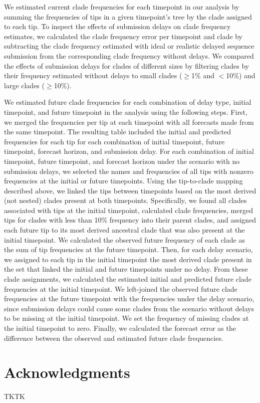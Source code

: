 \documentclass[9pt,lineno]{elife}
\begin{document}
We estimated current clade frequencies for each timepoint in our analysis by summing the frequencies of tips in a given timepoint's tree by the clade assigned to each tip.
To inspect the effects of submission delays on clade frequency estimates, we calculated the clade frequency error per timepoint and clade by subtracting the clade frequency estimated with ideal or realistic delayed sequence submission from the corresponding clade frequency without delays.
We compared the effects of submission delays for clades of different sizes by filtering clades by their frequency estimated without delays to small clades ($\ge$1\% and $<$10\%) and large clades ($\ge$10\%).

We estimated future clade frequencies for each combination of delay type, initial timepoint, and future timepoint in the analysis using the following steps.
First, we merged the frequencies per tip at each timepoint with all forecasts made from the same timepoint.
The resulting table included the initial and predicted frequencies for each tip for each combination of initial timepoint, future timepoint, forecast horizon, and submission delay.
For each combination of initial timepoint, future timepoint, and forecast horizon under the scenario with no submission delays, we selected the names and frequencies of all tips with nonzero frequencies at the initial or future timepoints.
Using the tip-to-clade mapping described above, we linked the tips between timepoints based on the most derived (not nested) clades present at both timepoints.
Specifically, we found all clades associated with tips at the initial timepoint, calculated clade frequencies, merged tips for clades with less than 10\% frequency into their parent clades, and assigned each future tip to its most derived ancestral clade that was also present at the initial timepoint.
We calculated the observed future frequency of each clade as the sum of tip frequencies at the future timepoint.
Then, for each delay scenario, we assigned to each tip in the initial timepoint the most derived clade present in the set that linked the initial and future timepoints under no delay.
From these clade assignments, we calculated the estimated initial and predicted future clade frequencies at the initial timepoint.
We left-joined the observed future clade frequencies at the future timepoint with the frequencies under the delay scenario, since submission delays could cause some clades from the scenario without delays to be missing at the initial timepoint.
We set the frequency of missing clades at the initial timepoint to zero.
Finally, we calculated the forecast error as the difference between the observed and estimated future clade frequencies.

\section{Acknowledgments}

TKTK

\nocite{*} %

\end{document}
